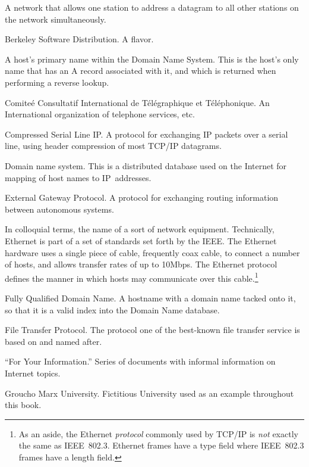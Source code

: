 \documentclass[11pt,makeidx]{report}
\def\emph#1{{\em{#1}}}
\begin{document}
{\begin{dispitems}
	A network that allows one station to address a datagram
	to all other stations on the network simultaneously.

\ditem[BSD]
	Berkeley Software Distribution. A \unix{} flavor.

	A host's primary name within the Domain Name System. This
	is the host's only name that has an A record 
	associated with it, and which is returned when performing
	a reverse lookup.

\ditem[CCITT]
        Comite\'e Consultatif International de  T\'el\'egraphique
        et T\'el\'ephonique. An International organization of
        telephone services, etc.

\ditem[CSLIP]
	Compressed Serial Line IP. A protocol for exchanging IP
	packets over a serial line, using header compression of
	most TCP/IP datagrams.

\ditem[DNS]
        Domain name system. This is a distributed database used on the
        Internet for mapping of host names to IP~addresses.

\ditem[EGP]
	External Gateway Protocol. A protocol for exchanging
	routing information between autonomous systems.

\ditem[Ethernet]
	In colloquial terms, the name of a sort of network equipment.
	Technically, Ethernet is part of a set of standards set forth by
	the IEEE. The Ethernet hardware uses a single piece of cable,
	frequently coax cable, to connect a number of hosts, and
	allows transfer rates of up to 10Mbps. The Ethernet protocol
	defines the manner in which hosts may communicate over
	this cable.\footnote{
	 As an aside, the Ethernet \emph{protocol} commonly used by TCP/IP
	 is \emph{not} exactly the same as IEEE~802.3. Ethernet frames
	 have a type field where IEEE~802.3 frames have a length field.
	}

\ditem[FQDN]
	Fully Qualified Domain Name. A hostname with a domain name
	tacked onto it, so that it is a valid index into the Domain Name
	database.

\ditem[FTP]
        File Transfer Protocol. The protocol one of the best-known
        file transfer service is based on and named after.

\ditem[FYI]
        ``For Your Information.'' Series of documents with informal
        information on Internet topics.

\ditem[GMU]
	Groucho Marx University. Fictitious University used as an example
	throughout this book.


\end{dispitems}}
\end{document}
